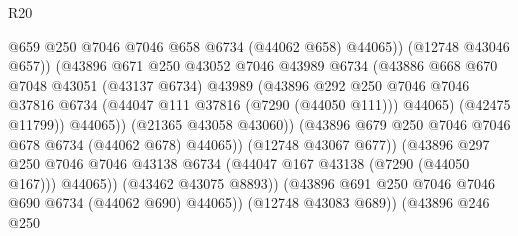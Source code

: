 \begin{lexlean}{R20}
\begin{coremodule}
{                                            @659
                                            @250
                                            @7046
                                            @7046
                                            @658
                                            @6734
                                            (@44062 @658)
                                            @44065))
                                        (@12748 @43046 @657))
                                      (@43896
                                        @671
                                        @250
                                        @43052
                                        @7046
                                        @43989
                                        @6734
                                        (@43886
                                          @668
                                          @670
                                          @7048
                                          @43051
                                          (@43137 @6734)
                                          @43989
                                          (@43896
                                            @292
                                            @250
                                            @7046
                                            @7046
                                            @37816
                                            @6734
                                            (@44047 @111 @37816 (@7290 (@44050 @111)))
                                            @44065)
                                          (@42475 @11799))
                                        @44065))
                                    (@21365 @43058 @43060))
                                  (@43896 @679 @250 @7046 @7046 @678 @6734 (@44062 @678) @44065))
                                (@12748 @43067 @677))
                              (@43896
                                @297
                                @250
                                @7046
                                @7046
                                @43138
                                @6734
                                (@44047 @167 @43138 (@7290 (@44050 @167)))
                                @44065))
                            (@43462 @43075 @8893))
                          (@43896 @691 @250 @7046 @7046 @690 @6734 (@44062 @690) @44065))
                        (@12748 @43083 @689))
                      (@43896
                        @246
                        @250
}
\end{coremodule}
\end{lexlean}
